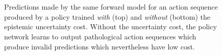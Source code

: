 \documentclass{article} %
\begin{document}
\begin{figure}[t!]
    \centering
     \\
     \\

    \caption{Predictions made by the same forward model for an action sequence produced by a policy trained \textit{with} (top) and \textit{without} (bottom) the epistemic uncertainty cost. Without the uncertainty cost, the policy network learns to output pathological action sequences which produce invalid predictions which nevertheless have low cost.}
    \label{svg-pred}
\end{figure}
\end{document}
